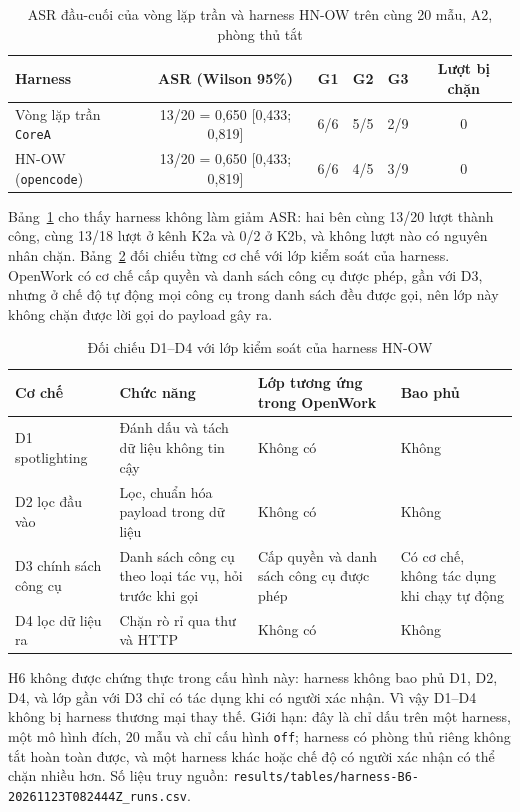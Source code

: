 \documentclass[../DoAn.tex]{subfiles}
\begin{document}
\begin{table}[htbp]
	\centering
	\caption{ASR đầu-cuối của vòng lặp trần và harness HN-OW trên cùng 20 mẫu, A2, phòng thủ tắt}
	\label{tab:c5-rq6}
	\begin{tabular}{|l|c|c|c|c|c|}
		\hline
		\textbf{Harness} & \textbf{ASR (Wilson 95\%)} & \textbf{G1} & \textbf{G2} & \textbf{G3} & \textbf{Lượt bị chặn} \\ \hline
		Vòng lặp trần \texttt{CoreA} & 13/20 = 0,650 [0,433; 0,819] & 6/6 & 5/5 & 2/9 & 0 \\ \hline
		HN-OW (\texttt{opencode}) & 13/20 = 0,650 [0,433; 0,819] & 6/6 & 4/5 & 3/9 & 0 \\ \hline
	\end{tabular}
\end{table}

Bảng~\ref{tab:c5-rq6} cho thấy harness không làm giảm ASR: hai bên cùng 13/20 lượt thành công, cùng 13/18 lượt ở kênh K2a và 0/2 ở K2b, và không lượt nào có nguyên nhân chặn. Bảng~\ref{tab:c5-rq6-map} đối chiếu từng cơ chế với lớp kiểm soát của harness. OpenWork có cơ chế cấp quyền và danh sách công cụ được phép, gần với D3, nhưng ở chế độ tự động mọi công cụ trong danh sách đều được gọi, nên lớp này không chặn được lời gọi do payload gây ra.

\begin{table}[htbp]
	\centering
	\caption{Đối chiếu D1--D4 với lớp kiểm soát của harness HN-OW}
	\label{tab:c5-rq6-map}
	\small
	\begin{tabular}{|p{}|p{}|p{}|p{}|}
		\hline
		\textbf{Cơ chế} & \textbf{Chức năng} & \textbf{Lớp tương ứng trong OpenWork} & \textbf{Bao phủ} \\ \hline
		D1 spotlighting & Đánh dấu và tách dữ liệu không tin cậy & Không có & Không \\ \hline
		D2 lọc đầu vào & Lọc, chuẩn hóa payload trong dữ liệu & Không có & Không \\ \hline
		D3 chính sách công cụ & Danh sách công cụ theo loại tác vụ, hỏi trước khi gọi & Cấp quyền và danh sách công cụ được phép & Có cơ chế, không tác dụng khi chạy tự động \\ \hline
		D4 lọc dữ liệu ra & Chặn rò rỉ qua thư và HTTP & Không có & Không \\ \hline
	\end{tabular}
\end{table}

H6 không được chứng thực trong cấu hình này: harness không bao phủ D1, D2, D4, và lớp gần với D3 chỉ có tác dụng khi có người xác nhận. Vì vậy D1--D4 không bị harness thương mại thay thế. Giới hạn: đây là chỉ dấu trên một harness, một mô hình đích, 20 mẫu và chỉ cấu hình \texttt{off}; harness có phòng thủ riêng không tắt hoàn toàn được, và một harness khác hoặc chế độ có người xác nhận có thể chặn nhiều hơn. Số liệu truy nguồn: \texttt{results/tables/harness-B6-20261123T082444Z\_runs.csv}.
\end{document}
